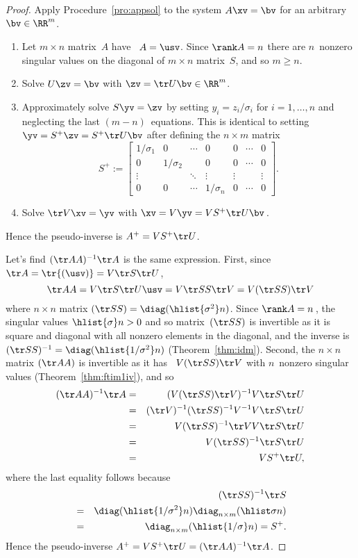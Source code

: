 \begin{proof} 
Apply Procedure~\ref{pro:appsol} to the system \(A\xv=\bv\) for an arbitrary \(\bv\in\RR^m\).
\begin{enumerate}
\item Let \(m\times n\) matrix~\(A\) have \svd\ \(A=\usv\).  
Since \(\rank A=n\) there are \(n\)~nonzero singular values on the diagonal of \(m\times n\) matrix~\(S\), and so \(m\geq n\).
\item Solve \(U\zv=\bv\) with \(\zv=\tr U\bv\in\RR^m\).
\item Approximately solve \(S\yv=\zv\) by setting \(y_i=z_i/\sigma_i\) for \(i=1,\ldots,n\) and neglecting the last \((m-n)\)~equations.
This is identical to setting \(\yv=S^+\zv=S^+\tr U\bv\) after defining the \(n\times m\) matrix
\begin{equation*}
S^+:=\begin{bmatrix} 1/\sigma_1&0&\cdots&0&0&\cdots&0
\\0&1/\sigma_2&&0&0&\cdots&0
\\\vdots&&\ddots&\vdots&\vdots&&\vdots
\\0&0&\cdots&1/\sigma_n&0&\cdots&0 \end{bmatrix}.
\end{equation*}
\item Solve \(\tr V\xv=\yv\) with \(\xv=V\yv=VS^+\tr U\bv\)\,.
\end{enumerate}
Hence the pseudo-inverse is \(A^+=VS^+\tr U\).

Let's find \((\tr AA)^{-1}\tr A\) is the same expression.
First, since \(\tr A=\tr{(\usv)}=V\tr S\tr U\),
\begin{equation*}
\tr AA=V\tr S\tr U\usv=V\tr SS\tr V=V(\tr SS)\tr V
\end{equation*}
where \(n\times n\) matrix \((\tr SS)=\diag(\hlist{\sigma^2}n)\).
Since \(\rank A=n\)\,, the singular values \(\hlist{\sigma}n>0\) and so matrix~\((\tr SS)\) is invertible as it is square and diagonal with all nonzero elements in the diagonal, and the inverse is \((\tr SS)^{-1}=\diag(\hlist{1/\sigma^2}n)\) (Theorem~\ref{thm:idm}).
Second, the \(n\times n\) matrix \((\tr AA)\) is invertible as it has \svd\ \(V(\tr SS)\tr V\) with \(n\)~nonzero singular values (Theorem~\ref{thm:ftim1iv}), and so
\begin{eqnarray*}
(\tr AA)^{-1}\tr A
&=&(V(\tr SS)\tr V)^{-1}V\tr S\tr U
\\&=&(\tr V)^{-1}(\tr SS)^{-1}V^{-1}V\tr S\tr U
\\&=&V(\tr SS)^{-1}\tr VV\tr S\tr U
\\&=&V(\tr SS)^{-1}\tr S\tr U
\\&=&VS^+\tr U,
\end{eqnarray*}
where the last equality follows because
\begin{eqnarray*}
&&(\tr SS)^{-1}\tr S
\\&=&\diag(\hlist{1/\sigma^2}n)\diag_{n\times m}(\hlist\sigma n)
\\&=&\diag_{n\times m}(\hlist{1/\sigma}n)=S^+.
\end{eqnarray*}
Hence the pseudo-inverse \(A^+=VS^+\tr U=(\tr AA)^{-1}\tr A\).
\end{proof}





